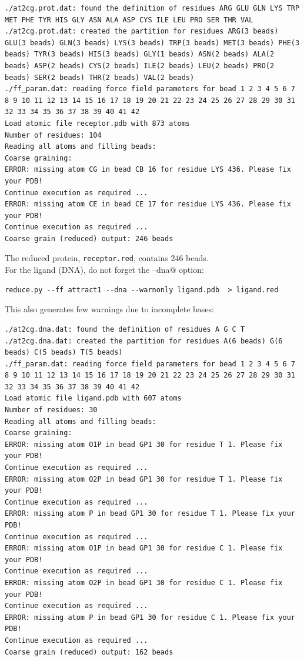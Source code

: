 \documentclass[12pt,a4paper]{article}
\begin{document}
\begin{verbatim}
./at2cg.prot.dat: found the definition of residues ARG GLU GLN LYS TRP MET PHE TYR HIS GLY ASN ALA ASP CYS ILE LEU PRO SER THR VAL 
./at2cg.prot.dat: created the partition for residues ARG(3 beads) GLU(3 beads) GLN(3 beads) LYS(3 beads) TRP(3 beads) MET(3 beads) PHE(3 beads) TYR(3 beads) HIS(3 beads) GLY(1 beads) ASN(2 beads) ALA(2 beads) ASP(2 beads) CYS(2 beads) ILE(2 beads) LEU(2 beads) PRO(2 beads) SER(2 beads) THR(2 beads) VAL(2 beads) 
./ff_param.dat: reading force field parameters for bead 1 2 3 4 5 6 7 8 9 10 11 12 13 14 15 16 17 18 19 20 21 22 23 24 25 26 27 28 29 30 31 32 33 34 35 36 37 38 39 40 41 42 
Load atomic file receptor.pdb with 873 atoms 
Number of residues: 104
Reading all atoms and filling beads:
Coarse graining:
ERROR: missing atom CG in bead CB 16 for residue LYS 436. Please fix your PDB!
Continue execution as required ...
ERROR: missing atom CE in bead CE 17 for residue LYS 436. Please fix your PDB!
Continue execution as required ...
Coarse grain (reduced) output: 246 beads 
\end{verbatim}

The reduced protein, {\tt receptor.red}, contains 246 beads.\\

For the ligand (DNA), do not forget the \verb@--dna@ option:
\begin{verbatim}
reduce.py --ff attract1 --dna --warnonly ligand.pdb  > ligand.red
\end{verbatim}
This also generates few warnings due to incomplete bases:
\begin{verbatim}
./at2cg.dna.dat: found the definition of residues A G C T 
./at2cg.dna.dat: created the partition for residues A(6 beads) G(6 beads) C(5 beads) T(5 beads) 
./ff_param.dat: reading force field parameters for bead 1 2 3 4 5 6 7 8 9 10 11 12 13 14 15 16 17 18 19 20 21 22 23 24 25 26 27 28 29 30 31 32 33 34 35 36 37 38 39 40 41 42 
Load atomic file ligand.pdb with 607 atoms 
Number of residues: 30
Reading all atoms and filling beads:
Coarse graining:
ERROR: missing atom O1P in bead GP1 30 for residue T 1. Please fix your PDB!
Continue execution as required ...
ERROR: missing atom O2P in bead GP1 30 for residue T 1. Please fix your PDB!
Continue execution as required ...
ERROR: missing atom P in bead GP1 30 for residue T 1. Please fix your PDB!
Continue execution as required ...
ERROR: missing atom O1P in bead GP1 30 for residue C 1. Please fix your PDB!
Continue execution as required ...
ERROR: missing atom O2P in bead GP1 30 for residue C 1. Please fix your PDB!
Continue execution as required ...
ERROR: missing atom P in bead GP1 30 for residue C 1. Please fix your PDB!
Continue execution as required ...
Coarse grain (reduced) output: 162 beads
\end{verbatim}
\end{document}

